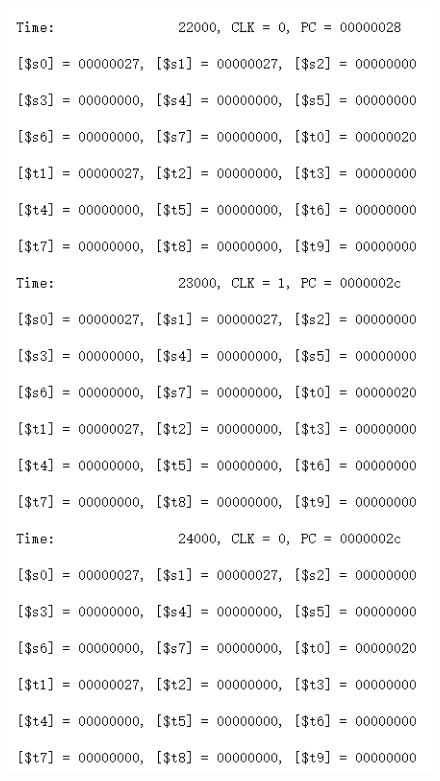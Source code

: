 \documentclass[12pt]{article}
\begin{document}
\begin{figure}[H]
\centering
\includegraphics[scale=1]{R8.jpg}
\end{figure}
\end{document}
